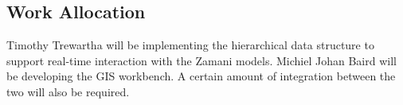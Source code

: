 \documentclass[12pt,a4paper]{article}
\begin{document}
\subsection{Work Allocation}
Timothy Trewartha will be implementing the hierarchical data structure to support
real-time interaction with the Zamani models. Michiel Johan Baird will be developing
the GIS workbench. A certain amount of integration between the two will also be required.






\end{document}
